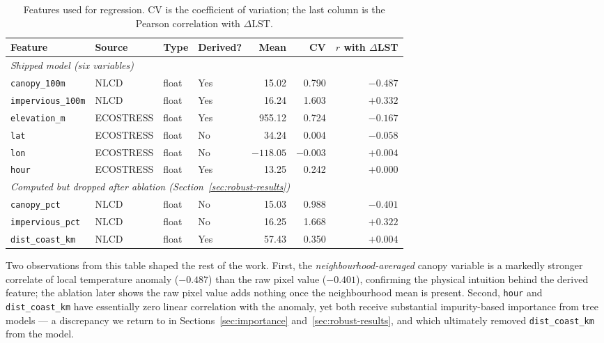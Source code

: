 \documentclass[10pt]{article}   %
\begin{document}
\begin{table}[H]
\centering
\caption{Features used for regression. CV is the coefficient of variation; the last column
is the Pearson correlation with $\Delta\text{LST}$.}
\label{tab:features}
\small
\begin{tabular}{llllrrr}
\toprule
Feature & Source & Type & Derived? & Mean & CV & $r$ with $\Delta$LST \\
\midrule
\multicolumn{7}{l}{\emph{Shipped model (six variables)}} \\
\texttt{canopy\_100m}     & NLCD      & float & Yes & 15.02   & 0.790  & $-0.487$ \\
\texttt{impervious\_100m} & NLCD      & float & Yes & 16.24   & 1.603  & $+0.332$ \\
\texttt{elevation\_m}     & ECOSTRESS & float & Yes & 955.12  & 0.724  & $-0.167$ \\
\texttt{lat}              & ECOSTRESS & float & No  & 34.24   & 0.004  & $-0.058$ \\
\texttt{lon}              & ECOSTRESS & float & No  & $-118.05$ & $-0.003$ & $+0.004$ \\
\texttt{hour}             & ECOSTRESS & float & Yes & 13.25   & 0.242  & $+0.000$ \\
\midrule
\multicolumn{7}{l}{\emph{Computed but dropped after ablation (Section~\ref{sec:robust-results})}} \\
\texttt{canopy\_pct}      & NLCD      & float & No  & 15.03   & 0.988  & $-0.401$ \\
\texttt{impervious\_pct}  & NLCD      & float & No  & 16.25   & 1.668  & $+0.322$ \\
\texttt{dist\_coast\_km}  & NLCD      & float & Yes & 57.43   & 0.350  & $+0.004$ \\
\bottomrule
\end{tabular}
\end{table}

Two observations from this table shaped the rest of the work. First, the
\emph{neighbourhood-averaged} canopy variable is a markedly stronger correlate of local
temperature anomaly ($-0.487$) than the raw pixel value ($-0.401$), confirming the physical
intuition behind the derived feature; the ablation later shows the raw pixel value adds
nothing once the neighbourhood mean is present. Second, \texttt{hour} and
\texttt{dist\_coast\_km} have essentially zero linear correlation with the anomaly, yet both
receive substantial impurity-based importance from tree models --- a discrepancy we return to
in Sections~\ref{sec:importance} and~\ref{sec:robust-results}, and which ultimately removed
\texttt{dist\_coast\_km} from the model.
\end{document}
